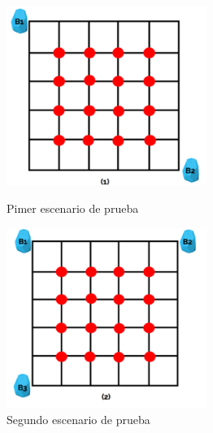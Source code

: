 \begin{figure}[H]
    \centering
    \begin{minipage}[b]{0.45\textwidth}
        \centering
    \includegraphics[width=6.5cm]{figs/dos_apes.png}
        \caption{Pimer escenario de prueba}
        \label{fig:escenario1}
    \end{minipage}
    \hfill
    \begin{minipage}[b]{0.45\textwidth}
        \centering
    \includegraphics[width=6.5cm]{figs/tres_apes}
        \caption{Segundo escenario de prueba}
        \label{fig:escenario2}
    \end{minipage}
    
    \vspace{1cm} %
    

\end{figure}

